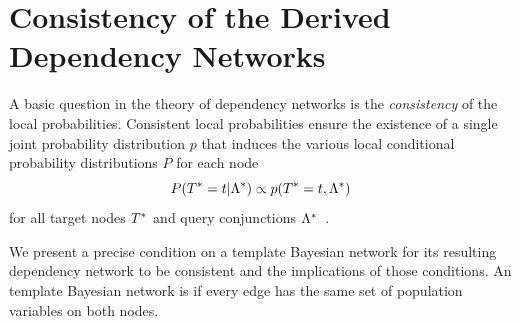 \documentclass[runningheads,a4paper]{llncs}
\begin{document}
 
 
%
%
%
%

\section{Consistency of the Derived Dependency Networks} \label{sec:consistency} A basic question in the theory of dependency networks is the {\em consistency} of the local probabilities.  Consistent local probabilities ensure the existence of a single joint probability distribution $p$ that induces the various local conditional probability distributions $P$ for each node
$$P(T^{*}\hspace{0.0ex} = t | \Lambda^{*}\hspace{0.0ex}) \propto p(T^{*}\hspace{0.0ex} =t,\Lambda^{*}\hspace{0.0ex})$$  
for all target nodes $T^{*}\hspace{0.0ex}$ and query conjunctions $\Lambda^{*}\hspace{0.0ex}$~\cite{Heckerman2000}.

We present a precise condition on a template Bayesian network for its resulting dependency network to be consistent and the implications of those conditions.  An  template Bayesian network is  if every edge has the same set of population variables on both nodes.
\end{document}
